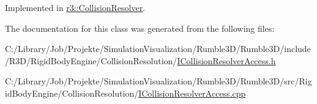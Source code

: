 Implemented in \mbox{\hyperlink{classr3_1_1_collision_resolver_a134da5221d60b34c568f7de29c9d0a58}{r3\+::\+Collision\+Resolver}}.



The documentation for this class was generated from the following files\+:\begin{DoxyCompactItemize}
\item 
C\+:/\+Library/\+Job/\+Projekte/\+Simulation\+Visualization/\+Rumble3\+D/\+Rumble3\+D/include/\+R3\+D/\+Rigid\+Body\+Engine/\+Collision\+Resolution/\mbox{\hyperlink{_i_collision_resolver_access_8h}{I\+Collision\+Resolver\+Access.\+h}}\item 
C\+:/\+Library/\+Job/\+Projekte/\+Simulation\+Visualization/\+Rumble3\+D/\+Rumble3\+D/src/\+Rigid\+Body\+Engine/\+Collision\+Resolution/\mbox{\hyperlink{_i_collision_resolver_access_8cpp}{I\+Collision\+Resolver\+Access.\+cpp}}\end{DoxyCompactItemize}
